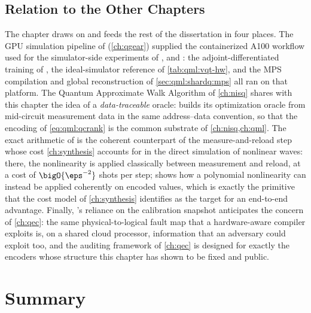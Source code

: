 \subsection{Relation to the Other Chapters}\label{sec:qml:synthesis:bridges}

The chapter draws on and feeds the rest of the dissertation in four places. The GPU simulation pipeline of \qgear{} (\cref{ch:qgear}) supplied the containerized A100 workflow used for the simulator-side experiments of \qpie{}, \vqt{} and \shardq{}: the adjoint-differentiated training of \qpie{}, the ideal-simulator reference of \cref{tab:qml:vqt-hw}, and the MPS compilation and global reconstruction of \cref{sec:qml:shardq:mps} all ran on that platform. The Quantum Approximate Walk Algorithm of \cref{ch:nisq} shares with this chapter the idea of a \emph{data-traceable} oracle: \qawa{} builds its optimization oracle from mid-circuit measurement data in the same address--data convention, so that the encoding of \cref{eq:qml:qcrank} is the common substrate of \cref{ch:nisq,ch:qml}. The exact arithmetic of \nnqa{} is the coherent counterpart of the measure-and-reload step whose cost \cref{ch:synthesis} accounts for in the direct simulation of nonlinear waves: there, the nonlinearity is applied classically between measurement and reload, at a cost of $\bigO{\eps^{-2}}$ shots per step; \nnqa{} shows how a polynomial nonlinearity can instead be applied coherently on encoded values, which is exactly the primitive that the cost model of \cref{ch:synthesis} identifies as the target for an end-to-end advantage. Finally, \shardq{}'s reliance on the calibration snapshot anticipates the concern of \cref{ch:qec}: the same physical-to-logical fault map that a hardware-aware compiler exploits is, on a shared cloud processor, information that an adversary could exploit too, and the auditing framework of \cref{ch:qec} is designed for exactly the encoders whose structure this chapter has shown to be fixed and public.

\section{Summary}\label{sec:qml:summary}

